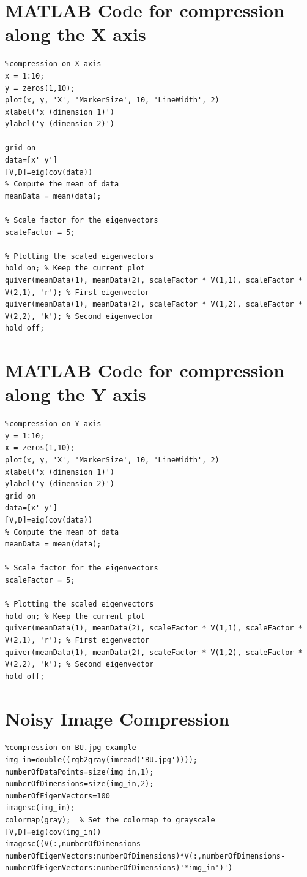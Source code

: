 \documentclass{article}
\begin{document}
\section{MATLAB Code for compression along the X axis}
\label{appendix:compressionx}
\begin{lstlisting}
%compression on X axis
x = 1:10;
y = zeros(1,10);
plot(x, y, 'X', 'MarkerSize', 10, 'LineWidth', 2) 
xlabel('x (dimension 1)')
ylabel('y (dimension 2)')

grid on
data=[x' y']
[V,D]=eig(cov(data))
% Compute the mean of data
meanData = mean(data);

% Scale factor for the eigenvectors
scaleFactor = 5;

% Plotting the scaled eigenvectors
hold on; % Keep the current plot
quiver(meanData(1), meanData(2), scaleFactor * V(1,1), scaleFactor * V(2,1), 'r'); % First eigenvector
quiver(meanData(1), meanData(2), scaleFactor * V(1,2), scaleFactor * V(2,2), 'k'); % Second eigenvector
hold off;

\end{lstlisting}


\section{MATLAB Code for compression along the Y axis}
\label{appendix:compressiony}
\begin{lstlisting}
%compression on Y axis
y = 1:10;
x = zeros(1,10);
plot(x, y, 'X', 'MarkerSize', 10, 'LineWidth', 2) 
xlabel('x (dimension 1)')
ylabel('y (dimension 2)')
grid on
data=[x' y']
[V,D]=eig(cov(data))
% Compute the mean of data
meanData = mean(data);

% Scale factor for the eigenvectors
scaleFactor = 5;

% Plotting the scaled eigenvectors
hold on; % Keep the current plot
quiver(meanData(1), meanData(2), scaleFactor * V(1,1), scaleFactor * V(2,1), 'r'); % First eigenvector
quiver(meanData(1), meanData(2), scaleFactor * V(1,2), scaleFactor * V(2,2), 'k'); % Second eigenvector
hold off;

\end{lstlisting}

\section{Noisy Image Compression}
\label{appendix:compressionbu}
\begin{lstlisting}
%compression on BU.jpg example
img_in=double((rgb2gray(imread('BU.jpg'))));
numberOfDataPoints=size(img_in,1);
numberOfDimensions=size(img_in,2);
numberOfEigenVectors=100
imagesc(img_in);
colormap(gray);  % Set the colormap to grayscale
[V,D]=eig(cov(img_in))
imagesc((V(:,numberOfDimensions-numberOfEigenVectors:numberOfDimensions)*V(:,numberOfDimensions-numberOfEigenVectors:numberOfDimensions)'*img_in')')
\end{lstlisting}
\end{document}
